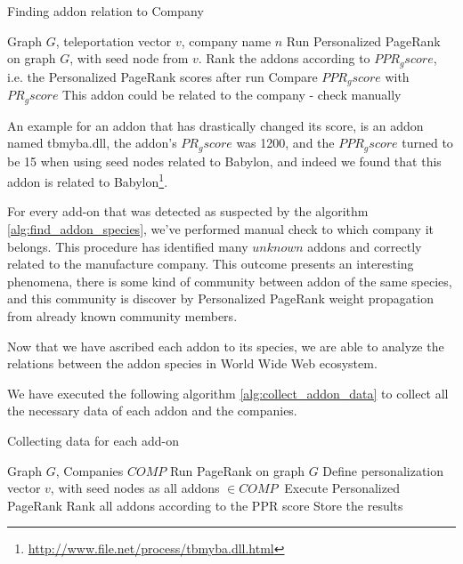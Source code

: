 \documentclass[11pt,oneside]{book}
\begin{document}
{{{{\begin{algorithm}[!t]
\caption{Finding addon relation to Company}
\label{alg:find_addon_species}
\begin{algorithmic}[1] 
\REQUIRE Graph $G$, teleportation vector $v$, company name $n$
\STATE Run Personalized PageRank on graph $G$, with seed node from $v$.
\STATE Rank the addons according to $PPR_gscore$, i.e. the Personalized PageRank scores after run
\STATE Compare $PPR_gscore$ with $PR_gscore$
\STATE This addon could be related to the company - check manually
\ENDIF
\ENDFOR
\end{algorithmic}
\end{algorithm}
An example for an addon that has drastically changed its score, is an addon named tbmyba.dll, the addon's $PR_gscore$ was 1200, and the $PPR_gscore$ turned to be 15 when using seed nodes related to Babylon, and indeed we found that this addon is related to Babylon\footnote{\url{http://www.file.net/process/tbmyba.dll.html}}.

For every add-on that was detected as suspected by the algorithm \autoref{alg:find_addon_species}, we've performed manual check to which company it belongs. This procedure has identified many $unknown$ addons and correctly related to the manufacture company. This outcome presents an interesting phenomena, there is some kind of community between addon of the same species, and this community is discover by Personalized PageRank weight propagation from already known community members.

Now that we have ascribed each addon to its species, we are able to analyze the relations between the addon species in World Wide Web ecosystem.

We have executed the following algorithm \autoref{alg:collect_addon_data} to collect all the necessary data of each addon and the companies.

\begin{algorithm}[!t]
\caption{Collecting data for each add-on}
\label{alg:collect_addon_data}
\begin{algorithmic}[1] 
\REQUIRE Graph $G$, Companies $COMP$
\STATE Run PageRank on graph $G$
\STATE Define personalization vector $v$, with seed nodes as all addons $\in COMP\ $
\STATE Execute Personalized PageRank
\STATE Rank all addons according to the PPR score
\STATE Store the results
\ENDFOR
\end{algorithmic}
\end{algorithm}

}}}}
\end{document}
